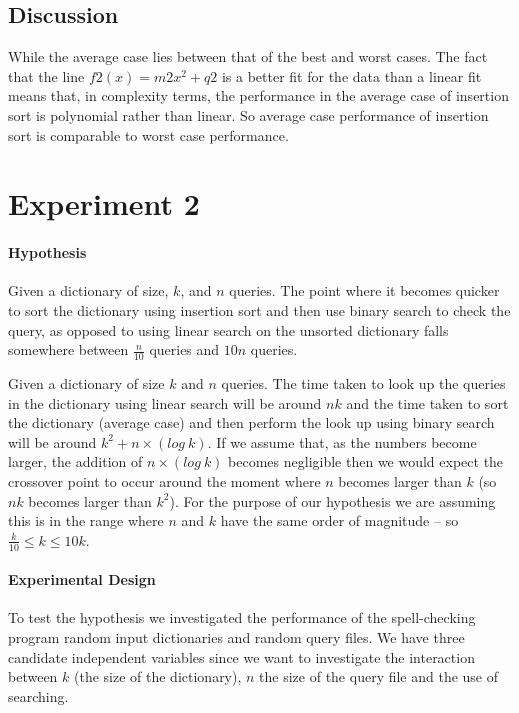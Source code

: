 \documentclass[a4]{article}
\begin{document}
\subsection{Discussion}

While the average case lies between that of the best and worst cases.  The fact that the line $f2(x) = m2x^2 + q2$ is a better fit for the data than a linear fit means that, in complexity terms, the performance in the average case of insertion sort is polynomial rather than linear.  So average case performance of insertion sort is comparable to worst case performance.


\section{Experiment 2}
\label{sec:exp_2}

\paragraph{Hypothesis} Given a dictionary of size, $k$, and $n$ queries.  The point where it becomes quicker to sort the dictionary using insertion sort and then use binary search to check the query, as opposed to using linear search on the unsorted dictionary falls somewhere between $\frac{n}{10}$ queries and $10n$ queries.

Given a dictionary of size $k$ and $n$ queries.  The time taken to look up the queries in the dictionary using linear search will be around $nk$ and the time taken to sort the dictionary (average case) and then perform the look up using binary search will be around $k^2 + n \times (log~  k)$.  If we assume that, as the numbers become larger, the addition  of $n \times (log~ k)$ becomes negligible then we would expect the crossover point to occur around the moment where $n$ becomes larger than $k$ (so $nk$ becomes larger than $k^2$).  For the purpose of our hypothesis we are assuming this is in the range where $n$ and $k$ have the same order of magnitude -- so $\frac{k}{10} \leq k \leq 10k$.

\paragraph{Experimental Design}
To test the hypothesis we investigated the performance of the spell-checking program random input dictionaries and random query files.  We have three candidate independent variables since we want to investigate the interaction between $k$ (the size of the dictionary), $n$ the size of the query file and the use of searching.
\end{document}
